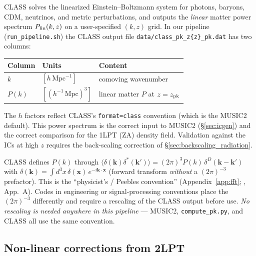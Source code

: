 \documentclass[12pt]{article}
\newcommand{\bx}{\mathbf{x}}
\newcommand{\bk}{\mathbf{k}}
\begin{document}
CLASS solves the linearized Einstein--Boltzmann system for
photons, baryons, CDM, neutrinos, and metric perturbations, and
outputs the \emph{linear} matter power spectrum
$P_{\rm lin}(k,z)$ on a user-specified $(k,z)$ grid.
In our pipeline (\texttt{run\_pipeline.sh}) the CLASS output file
\texttt{data/class\_pk\_z\{z\}\_pk.dat} has two columns:
%
\begin{center}
\begin{tabular}{lll}
\hline
Column & Units & Content \\
\hline
$k$     & $[h\,\mathrm{Mpc}^{-1}]$ & comoving wavenumber \\
$P(k)$  & $[(h^{-1}\,\mathrm{Mpc})^{3}]$ & linear matter $P$ at $z=z_{\rm pk}$ \\
\hline
\end{tabular}
\end{center}
%
The $h$ factors reflect CLASS's \texttt{format=class} convention
(which is the MUSIC2 default).  This power spectrum is the correct
input to MUSIC2 (\S\ref{sec:icgen}) and the correct comparison for
the 1LPT (ZA) density field.  Validation against the ICs at high
$z$ requires the back-scaling correction of
\S\ref{sec:backscaling_radiation}.

\begin{tcolorbox}[colback=yellow!5, colframe=orange!50!black,
                  title={\bfseries Fourier-convention pitfall},
                  coltitle=white, fonttitle=\bfseries,
                  before skip=1em, after skip=1em]
CLASS defines $P(k)$ through
$\langle\delta(\bk)\delta^*(\bk')\rangle
 =(2\pi)^3 P(k)\,\delta^D(\bk-\bk')$
with $\delta(\bk)=\int d^3x\,\delta(\bx)\,e^{-i\bk\cdot\bx}$
(forward transform \emph{without} a $(2\pi)^{-3}$ prefactor).
This is the ``physicist's / Peebles convention''
(Appendix~\ref{app:fft}; \citealt{Jeong2010}, App.~A).  Codes in
engineering or signal-processing conventions place the
$(2\pi)^{-3}$ differently and require a rescaling of the CLASS
output before use.  \emph{No rescaling is needed anywhere in this
pipeline} --- MUSIC2, \texttt{compute\_pk.py}, and CLASS all use
the same convention.
\end{tcolorbox}

\subsection{Non-linear corrections from 2LPT}
\end{document}
